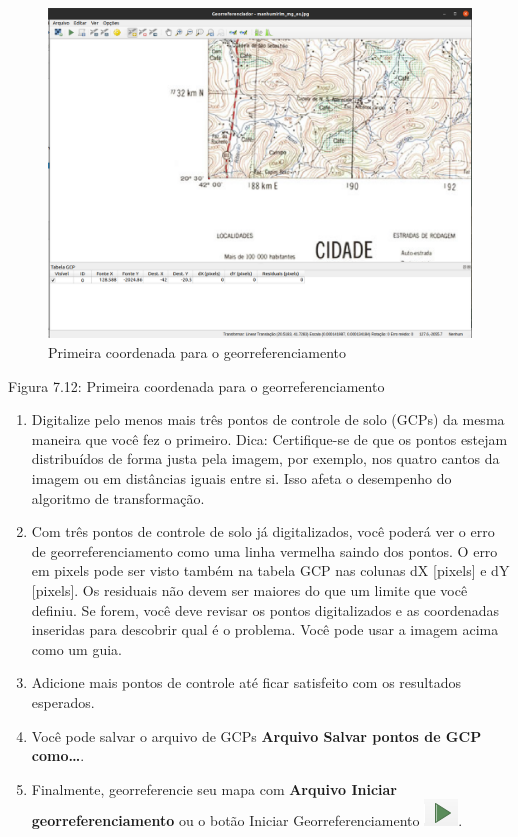 \documentclass[
  portuguese,
]{krantz}
\begin{document}
\begin{figure}
\centering
\includegraphics{media/modulo7/georef-3.png}
\caption{Primeira coordenada para o georreferenciamento}
\end{figure}

Figura 7.12: Primeira coordenada para o georreferenciamento

\begin{enumerate}
\def\labelenumi{\arabic{enumi}.}
\setcounter{enumi}{11}
\item
  Digitalize pelo menos mais três pontos de controle de solo (GCPs) da mesma maneira que você fez o primeiro. Dica: Certifique-se de que os pontos estejam distribuídos de forma justa pela imagem, por exemplo, nos quatro cantos da imagem ou em distâncias iguais entre si. Isso afeta o desempenho do algoritmo de transformação.
\item
  Com três pontos de controle de solo já digitalizados, você poderá ver o erro de georreferenciamento como uma linha vermelha saindo dos pontos. O erro em pixels pode ser visto também na tabela GCP nas colunas dX {[}pixels{]} e dY {[}pixels{]}. Os residuais não devem ser maiores do que um limite que você definiu. Se forem, você deve revisar os pontos digitalizados e as coordenadas inseridas para descobrir qual é o problema. Você pode usar a imagem acima como um guia.
\item
  Adicione mais pontos de controle até ficar satisfeito com os resultados esperados.
\item
  Você pode salvar o arquivo de GCPs \textbf{Arquivo Salvar pontos de GCP como\ldots{}}.
\item
  Finalmente, georreferencie seu mapa com \textbf{Arquivo Iniciar georreferenciamento} ou o botão Iniciar Georreferenciamento \includegraphics{media/modulo7/georef-start-btn.png}.
\end{enumerate}
\end{document}
